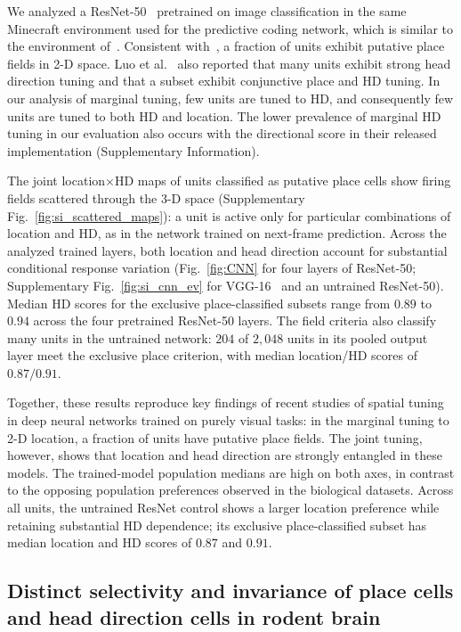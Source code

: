 \documentclass[11pt]{article}
\begin{document}
We analyzed a ResNet-50~\cite{He2016} pretrained on image classification in the same Minecraft environment used for the predictive coding network, which is similar to the environment of~\cite{Luo2024}. Consistent with~\cite{Luo2024}, a fraction of units exhibit putative place fields in 2-D space. Luo et al.~\cite{Luo2024} also reported that many units exhibit strong head direction tuning and that a subset exhibit conjunctive place and HD tuning. In our analysis of marginal tuning, few units are tuned to HD, and consequently few units are tuned to both HD and location. The lower prevalence of marginal HD tuning in our evaluation also occurs with the directional score in their released implementation (Supplementary Information).

The joint location$\times$HD maps of units classified as putative place cells show firing fields scattered through the 3-D space (Supplementary Fig.~\ref{fig:si_scattered_maps}): a unit is active only for particular combinations of location and HD, as in the network trained on next-frame prediction. Across the analyzed trained layers, both location and head direction account for substantial conditional response variation (Fig.~\ref{fig:CNN} for four layers of ResNet-50; Supplementary Fig.~\ref{fig:si_cnn_ev} for VGG-16~\cite{Simonyan2015} and an untrained ResNet-50). Median HD scores for the exclusive place-classified subsets range from $0.89$ to $0.94$ across the four pretrained ResNet-50 layers. The field criteria also classify many units in the untrained network: $204$ of $2{,}048$ units in its pooled output layer meet the exclusive place criterion, with median location/HD scores of $0.87/0.91$.

Together, these results reproduce key findings of recent studies of spatial tuning in deep neural networks trained on purely visual tasks: in the marginal tuning to 2-D location, a fraction of units have putative place fields. The joint tuning, however, shows that location and head direction are strongly entangled in these models. The trained-model population medians are high on both axes, in contrast to the opposing population preferences observed in the biological datasets. Across all units, the untrained ResNet control shows a larger location preference while retaining substantial HD dependence; its exclusive place-classified subset has median location and HD scores of $0.87$ and $0.91$.

\FloatBarrier
\subsection{Distinct selectivity and invariance of place cells and head direction cells in rodent brain}
\end{document}
